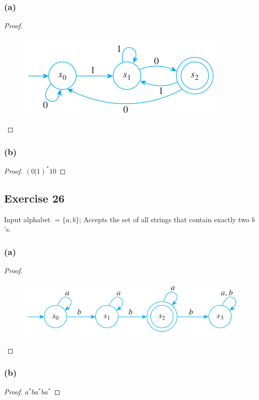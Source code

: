 \documentclass[14pt]{extarticle}
\begin{document}
\subsubsection{(a)}
\begin{proof}
    \begin{figure}[ht!]
        \centering
        \includegraphics[scale=0.5]{../images/12.2.25.a.png}
    \end{figure}
\end{proof}

\subsubsection{(b)}
\begin{proof}
    \((0|1)^*10\)
\end{proof}

\subsection{Exercise 26}
Input alphabet \(= \{a, b\}\); Accepts the set of all strings that contain exactly two \(b\)’s.

\subsubsection{(a)}
\begin{proof}
    \begin{figure}[ht!]
        \centering
        \includegraphics[scale=0.5]{../images/12.2.26.a.png}
    \end{figure}
\end{proof}

\subsubsection{(b)}
\begin{proof}
    \(a^*ba^*ba^*\)
\end{proof}
\end{document}
